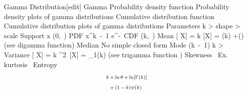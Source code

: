 Gamma Distribution[edit]
Gamma
Probability density function
Probability density plots of gamma distributions
Cumulative distribution function
Cumulative distribution plots of gamma distributions
Parameters	
\scriptstyle k \;> shape
\scriptstyle \theta \;>\, scale
Support	\scriptstyle x \;\in\; (0,\, \infty)\!
PDF	\scriptstyle {} x^{k \,-\, 1} e^{-}\,\!
CDF	\scriptstyle {} \gamma\left(k,\, \right)\!
Mean	\scriptstyle {}[ X] = k \theta \!
\scriptstyle {}[\ln X] = \psi(k) +\ln(\theta)\!
(see digamma function)
Median	No simple closed form
Mode	\scriptstyle (k \,-\, 1)\theta {} k \;>\,\!
Variance	\scriptstyle{}[ X] = k \theta^2\,\!
\scriptstyle{}[\ln X] = \psi_1(k)\!
(see trigamma function )
Skewness	\scriptstyle {}\,\!
Ex. kurtosis	\scriptstyle {}\,\!
Entropy	\scriptstyle \begin{align}
                      \scriptstyle k &\scriptstyle \,+\, \ln\theta \,+\, \ln[\Gamma(k)]\\
                      \scriptstyle   &\scriptstyle \,+\, (1 \,-\, k)\psi(k)
                    \end{align}
